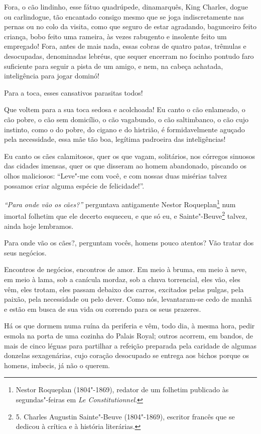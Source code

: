 Fora, o cão lindinho, esse fátuo quadrúpede, dinamarquês, King
Charles, dogue ou carlindogue, tão encantado consigo mesmo que se
joga indiscretamente nas pernas ou no colo da visita, como que seguro de estar agradando, bagunceiro feito criança, bobo feito uma
rameira, às vezes rabugento e insolente feito um empregado! Fora,
antes de mais nada, essas cobras de quatro patas, trêmulas e desocupadas,
denominadas lebréus, que sequer encerram no focinho pontudo faro
suficiente para seguir a pista de um amigo, e nem, na cabeça
achatada, inteligência para jogar dominó!

Para a toca, esses cansativos parasitas todos!

Que voltem para a sua toca sedosa e acolchoada! Eu canto o cão enlameado,
o cão pobre, o cão sem domicílio, o cão vagabundo, o cão saltimbanco, o
cão cujo instinto, como o do pobre, do cigano e do histrião, é
formidavelmente aguçado pela necessidade, essa mãe tão boa, 
legítima padroeira das inteligências!

Eu canto os cães calamitosos, quer os que vagam, solitários, nos
córregos sinuosos das cidades imensas, quer os que disseram ao
homem abandonado, piscando os olhos maliciosos:
“Leve"-me com você, e com nossas duas misérias talvez
possamos criar alguma espécie de felicidade!''.

\textit{“Para onde vão os cães?''} perguntava antigamente
Nestor Roqueplan\protect\footnote{ Nestor Roqueplan (1804"-1869), 
redator de um folhetim publicado às
segundas"-feiras em \textit{Le Constitutionnel}.}
 num imortal folhetim que ele decerto esqueceu, e que 
só eu, e Sainte"-Beuve\protect\footnote{ 5. Charles Augustin 
Sainte"-Beuve (1804"-1869), escritor francês que
se dedicou à crítica e à história literárias.}
talvez, ainda hoje lembramos.

Para onde vão os cães?, perguntam vocês, homens pouco atentos? Vão tratar dos seus negócios.

Encontros de negócios, encontros de amor. Em meio à bruma, em meio à
neve, em meio à lama, sob a canícula mordaz, sob a chuva torrencial,
eles vão, eles vêm, eles trotam, eles passam debaixo dos carros, excitados
pelas pulgas, pela paixão, pela necessidade ou pelo dever. Como nós,
levantaram-se cedo de manhã e estão em busca de sua vida ou correndo para os
seus prazeres.

Há os que dormem numa ruína da periferia e vêm, todo dia, à mesma
hora, pedir esmola na porta de uma cozinha do Palais Royal;
outros acorrem, em bandos, de mais de cinco léguas para
partilhar a refeição preparada pela caridade de algumas donzelas
sexagenárias, cujo coração desocupado se entrega aos bichos porque
os homens, imbecis, já não o querem.

